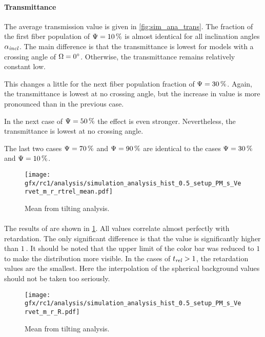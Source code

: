 \paragraph{Transmittance}
The average transmission value is given in \cref{fig:sim_ana_trans}.
The fraction of the first fiber population of $\textnormal{$\Psi$}=\SI{10}{\percent}$ is almost identical for all inclination angles $\textnormal{$\alpha_{\mathit{incl}}$}$.
The main difference is that the transmittance is lowest for models with a crossing angle of $\textnormal{$\Omega$} = \SI{0}{\degree}$.
Otherwise, the transmittance remains relatively constant low.
\par
%
This changes a little for the next fiber population fraction of $\textnormal{$\Psi$}=\SI{30}{\percent}$.
Again, the transmittance is lowest at no crossing angle, but the increase in value is more pronounced than in the previous case.
\par
%
In the next case of $\textnormal{$\Psi$}=\SI{50}{\percent}$ the effect is even stronger.
Nevertheless, the transmittance is lowest at no crossing angle.
\par
%
The last two cases $\textnormal{$\Psi$}=\SI{70}{\percent}$ and $\textnormal{$\Psi$}=\SI{90}{\percent}$ are identical to the cases $\textnormal{$\Psi$}=\SI{30}{\percent}$ and $\textnormal{$\Psi$}=\SI{10}{\percent}$.
%
%
%
\begin{figure}[!p]
\centering
\texttt{[image: gfx/rc1/analysis/simulation\_analysis\_hist\_0.5\_setup\_PM\_s\_Vervet\_m\_r\_rtrel\_mean.pdf]}
\caption{Mean \trel{} from tilting analysis. }
\label{fig:sim_ana_trel}
\end{figure}
%
\paragraph{\trel}
The results of \trel{} are shown in \cref{fig:sim_ana_trel}.
All values correlate almost perfectly with retardation.
The only significant difference is that the \trel{} value is significantly higher than $\SI{1}{}$.
It should be noted that the upper limit of the color bar was reduced to $\SI{1}{}$ to make the distribution more visible.
In the cases of $\textnormal{$t_\mathit{rel}$} > \SI{1}{}$, the retardation values are the smallest.
Here the interpolation of the spherical background values should not be taken too seriously.
%
%
%
\begin{figure}[!p]
\centering
\texttt{[image: gfx/rc1/analysis/simulation\_analysis\_hist\_0.5\_setup\_PM\_s\_Vervet\_m\_r\_R.pdf]}
\caption{Mean \rvalue{} from tilting analysis. }
\label{fig:sim_ana_rvalue}
\end{figure}
%
